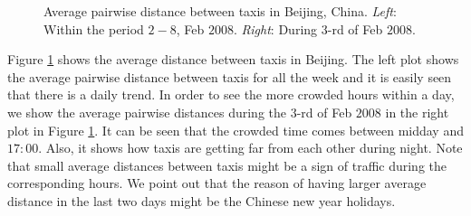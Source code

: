 \documentclass[article]{jss}
\begin{document}
\begin{figure}[!h]
  \centering
  \caption{Average pairwise distance between taxis in Beijing, China. \emph{Left}: Within the period $2-8$, Feb $2008$. \emph{Right}: During $3$-rd of Feb $2008$.}
  \label{distbijing}
  \end{figure}
Figure \ref{distbijing} shows the average distance between taxis in Beijing. The left plot shows the average pairwise distance between taxis for all the week and it is easily seen that there is a daily trend. In order to see the more crowded hours within a day, we show the average pairwise distances during the $3$-rd of Feb $2008$ in the right plot in Figure \ref{distbijing}. It can be seen that the crowded time comes between midday and $17:00$. Also, it shows how taxis are getting far from each other during night. Note that small average distances between taxis might be a sign of traffic during the corresponding hours. We point out that the reason of having larger average distance in the last two days might be the Chinese new year holidays.
\end{document}
